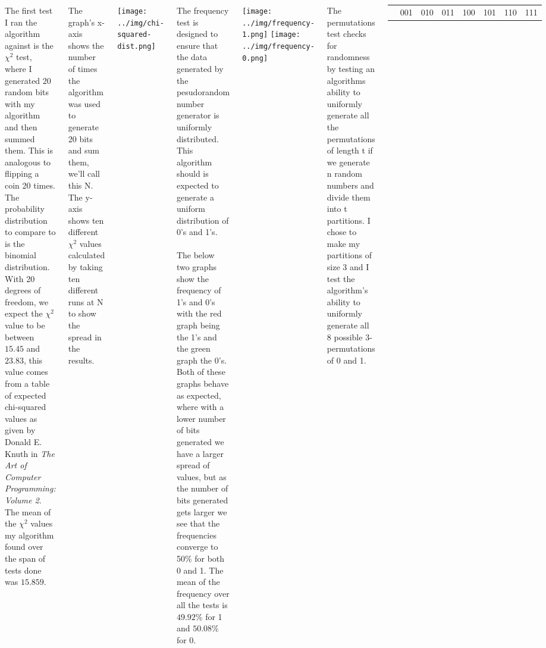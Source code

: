 \documentclass[24pt, a0paper, landscape]{tikzposter}
\begin{document}
\begin{columns}

{
The first test I ran the algorithm against is the $\chi^2$ test, where I generated 20 random bits with my algorithm and then summed them. This is analogous to flipping a coin 20 times. The probability distribution to compare to is the binomial distribution. With 20 degrees of freedom, we expect the $\chi^2$ value to be between $15.45$ and $23.83$, this value comes from a table of expected chi-squared values as given by Donald E. Knuth in \textit{The Art of Computer Programming: Volume 2}. The mean of the $\chi^2$ values my algorithm found over the span of tests done was $15.859$.\\
\\
\begin{minipage}{0.175\textwidth}
The graph's x-axis shows the number of times the algorithm was used to generate 20 bits and sum them, we'll call this N. The y-axis shows ten different $\chi^2$ values calculated by taking ten different runs at N to show the spread in the results.
\end{minipage}
\begin{minipage}{0.175\textwidth}
	\begin{tikzfigure}
		\texttt{[image: ../img/chi-squared-dist.png]}
	\end{tikzfigure}
\end{minipage}
}

{
The frequency test is designed to ensure that the data generated by the pesudorandom number generator is uniformly distributed. This algorithm should is expected to generate a uniform distribution of 0's and 1's.\\
\\
The below two graphs show the frequency of 1's and 0's with the red graph being the 1's and the green graph the 0's. Both of these graphs behave as expected, where with a lower number of bits generated we have a larger spread of values, but as the number of bits generated gets larger we see that the frequencies converge to 50\% for both 0 and 1. The mean of the frequency over all the tests is $49.92$\% for 1 and $50.08$\% for 0.

	\begin{tikzfigure}
		\texttt{[image: ../img/frequency-1.png]}
		\texttt{[image: ../img/frequency-0.png]}
	\end{tikzfigure}

}
{
The permutations test checks for randomness by testing an algorithms ability to uniformly generate all the permutations of length t if we generate n random numbers and divide them into t partitions. I chose to make my partitions of size 3 and I test the algorithm's ability to uniformly generate all 8 possible 3-permutations of 0 and 1.
\\
\begin{center}
\begin{tabular}{ c c c c c c c c }
	\centering
	000 &
	001 &
	010 &
	011 &
	100 &
	101 &
	110 &
	111
\end{tabular}
\end{center}

}
\end{columns}
\end{document}
